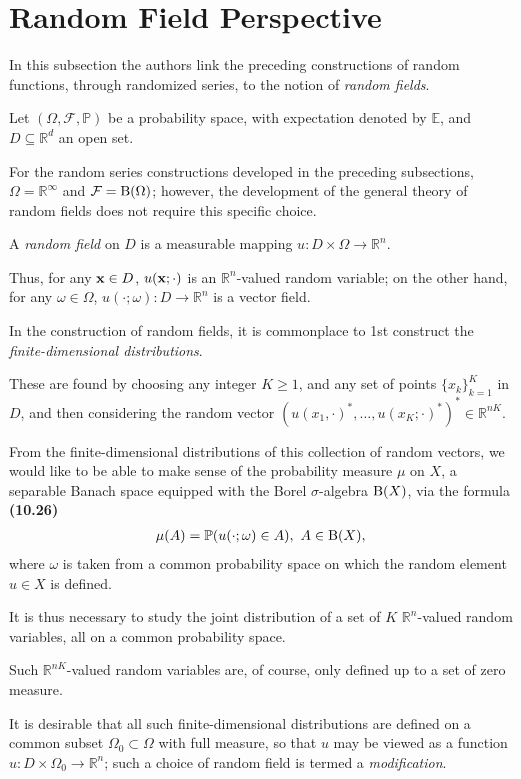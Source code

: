 \documentclass[oneside,11pt]{book}
\numberwithin{equation}{section}
\begin{document}
\section{Random Field Perspective}
In this subsection the authors link the preceding constructions of random functions, through randomized series, to the notion of \textit{random fields}.

Let $(\Omega,\mathcal{F},\mathbb{P})$ be a probability space, with expectation denoted by $\mathbb{E}$, and $D\subseteq\mathbb{R}^d$ an open set.

For the random series constructions developed in the preceding subsections, $\Omega = \mathbb{R}^\infty$ and $\mathcal{F} = {\rm B}(\Omega)$; however, the development of the general theory of random fields does not require this specific choice.

A \textit{random field} on $D$ is a measurable mapping $u:D\times\Omega\to\mathbb{R}^n$.

Thus, for any ${\bf x}\in D$, $u({\bf x};\cdot)$ is an $\mathbb{R}^n$-valued random variable; on the other hand, for any $\omega\in\Omega$, $u(\cdot;\omega):D\to\mathbb{R}^n$ is a vector field.

In the construction of random fields, it is commonplace to 1st construct the \textit{finite-dimensional distributions}.

These are found by choosing any integer $K\ge 1$, and any set of points $\{x_k\}_{k=1}^K$ in $D$, and then considering the random vector $(u(x_1,\cdot)^*,\ldots,u(x_K;\cdot)^*)^*\in\mathbb{R}^{nK}$.

From the finite-dimensional distributions of this collection of random vectors, we would like to be able to make sense of the probability measure $\mu$ on $X$, a separable Banach space equipped with the Borel $\sigma$-algebra ${\rm B}(X)$, via the formula \textbf{(10.26)}
\begin{align*}
    \mu(A) = \mathbb{P}(u(\cdot;\omega)\in A),\ A\in{\rm B}(X),
\end{align*}
where $\omega$ is taken from a common probability space on which the random element $u\in X$ is defined.

It is thus necessary to study the joint distribution of a set of $K$ $\mathbb{R}^n$-valued random variables, all on a common probability space.

Such $\mathbb{R}^{nK}$-valued random variables are, of course, only defined up to a set of zero measure.

It is desirable that all such finite-dimensional distributions are defined on a common subset $\Omega_0\subset\Omega$ with full measure, so that $u$ may be viewed as a function $u:D\times\Omega_0\to\mathbb{R}^n$; such a choice of random field is termed a \textit{modification}.
\end{document}
